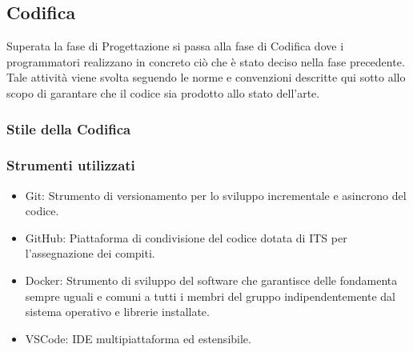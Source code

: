 \subsection{Codifica}
Superata la fase di Progettazione si passa alla fase di Codifica dove i programmatori
realizzano in concreto ciò che è stato deciso nella fase precedente.
Tale attività viene svolta seguendo le norme e convenzioni descritte qui sotto allo
scopo di garantare che il codice sia prodotto allo stato dell'arte.

\subsubsection{Stile della Codifica}


\subsubsection{Strumenti utilizzati}
    \begin{itemize}
    \item Git: Strumento di versionamento per lo sviluppo incrementale e asincrono del codice.
    \item GitHub: Piattaforma di condivisione del codice dotata di ITS per l'assegnazione dei compiti.
    \item Docker: Strumento di sviluppo del software che garantisce delle fondamenta sempre uguali
      e comuni a tutti i membri del gruppo indipendentemente dal sistema operativo e librerie installate.
    \item VSCode: IDE multipiattaforma ed estensibile.
    \end{itemize}
